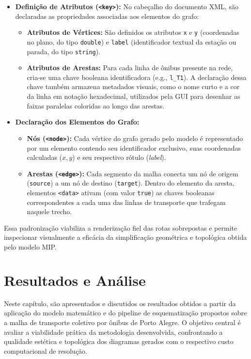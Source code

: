 \documentclass[cic,tc]{infufrgs}
\begin{document}
\begin{itemize}
    \item \textbf{Definição de Atributos (\texttt{<key>}):} No cabeçalho do documento XML, são declaradas as propriedades associadas aos elementos do grafo:
    \begin{itemize}
        \item \textbf{Atributos de Vértices:} São definidos os atributos \texttt{x} e \texttt{y} (coordenadas no plano, do tipo \texttt{double}) e \texttt{label} (identificador textual da estação ou parada, do tipo \texttt{string}).
        \item \textbf{Atributos de Arestas:} Para cada linha de ônibus presente na rede, cria-se uma chave booleana identificadora (e.g., \texttt{l\_T1}). A declaração dessa chave também armazena metadados visuais, como o nome curto e a cor da linha em notação hexadecimal, utilizados pela GUI para desenhar as faixas paralelas coloridas ao longo das arestas.
    \end{itemize}
    \item \textbf{Declaração dos Elementos do Grafo:}
    \begin{itemize}
        \item \textbf{Nós (\texttt{<node>}):} Cada vértice do grafo gerado pelo modelo é representado por um elemento contendo seu identificador exclusivo, suas coordenadas calculadas ($x, y$) e seu respectivo rótulo (\textit{label}).
        \item \textbf{Arestas (\texttt{<edge>}):} Cada segmento da malha conecta um nó de origem (\texttt{source}) a um nó de destino (\texttt{target}). Dentro do elemento da aresta, elementos \texttt{<data>} ativam (com valor \texttt{true}) as chaves booleanas correspondentes a cada uma das linhas de transporte que trafegam naquele trecho.
    \end{itemize}
\end{itemize}

Essa padronização viabiliza a renderização fiel das rotas sobrepostas e permite inspecionar visualmente a eficácia da simplificação geométrica e topológica obtida pelo modelo MIP.

\chapter{Resultados e Análise}
\label{cap:resultados}

Neste capítulo, são apresentados e discutidos os resultados obtidos a partir da aplicação do modelo matemático e do pipeline de esquematização propostos sobre a malha de transporte coletivo por ônibus de Porto Alegre. O objetivo central é avaliar a viabilidade prática da metodologia desenvolvida, confrontando a qualidade estética e topológica dos diagramas gerados com o respectivo custo computacional de resolução.
\end{document}
